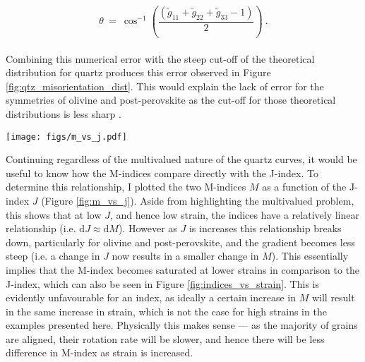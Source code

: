 \documentclass[a4paper,12pt,twoside]{report}
\numberwithin{equation}{chapter}
\begin{document}
\begin{equation}
\theta\ =\ \cos^{-1}\left( \frac{(\tilde{g}_{11} + \tilde{g}_{22} + \tilde{g}_{33} - 1)}{2} \right)\ .
\end{equation}
\\
Combining this numerical error with the steep cut-off of the theoretical distribution for quartz produces this error observed in Figure \ref{fig:qtz_misorientation_dist}. This would explain the lack of error for the symmetries of olivine and post-perovskite as the cut-off for those theoretical distributions is less sharp \citep[see Figure \ref{fig:misorientation_example}, or][for more distributions]{Wheeler2001}.

\begin{figure*}[p]
  \centering
    \texttt{[image: figs/m\_vs\_j.pdf]}
  \caption[Relationship of M- and J-indices]{M-index (continuous and discrete) as a function of J-index. \textbf{Top row} shows olivine, \textbf{middle row} shows quartz and \textbf{bottom row} shows post-perovskite, with the \textbf{left column} showing data from axial compression VPSC models and the \textbf{right column} data from simple shear. Calculations used $n$ = 5,000 grains.} 
  \label{fig:m_vs_j}
\end{figure*} 
  
Continuing regardless of the multivalued nature of the quartz curves, it would be useful to know how the M-indices compare directly with the J-index. To determine this relationship, I plotted the two M-indices $M$ as a function of the J-index $J$ (Figure \ref{fig:m_vs_j}). Aside from highlighting the multivalued problem, this shows that at low $J$, and hence low strain, the indices have a relatively linear relationship (i.e. $\mathrm{d}J \approx \mathrm{d}M$). However as $J$ is increases this relationship breaks down, particularly for olivine and post-perovskite, and the gradient becomes less steep (i.e. a change in $J$ now results in a smaller change in $M$). This essentially implies that the M-index becomes saturated at lower strains in comparison to the J-index, which can also be seen in Figure \ref{fig:indices_vs_strain}. This is evidently unfavourable for an index, as ideally a certain increase in $M$ will result in the same increase in strain, which is not the case for high strains in the examples presented here. Physically this makes sense --- as the majority of grains are aligned, their rotation rate will be slower, and hence there will be less difference in M-index as strain is increased.  
\end{document}
